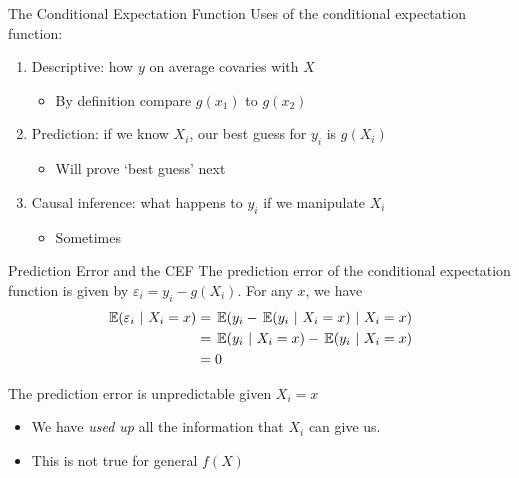 \documentclass[aspectratio=169,t,11pt,table]{beamer}
\begin{document}
\begin{frame}{The Conditional Expectation Function}
  Uses of the conditional expectation function:
  \begin{enumerate}
    \item \alert{Descriptive}: how $y$ on average covaries with $X$ 
    \begin{itemize}
      \item By definition compare $g(x_1)$ to $g(x_2)$
    \end{itemize} 

    \item \alert{Prediction}: if we know $X_i$, our best guess for $y_i$ is $g(X_i)$ 
    \begin{itemize}
      \item Will prove `best guess' next
    \end{itemize} 
    
    \item \alert{Causal inference}: what happens to $y_i$ if we manipulate $X_i$ 
    \begin{itemize}
      \item Sometimes
    \end{itemize}
  \end{enumerate}

\end{frame}


\begin{frame}{Prediction Error and the CEF}
  The prediction error of the conditional expectation function is given by $\varepsilon_i = y_i - g(X_i)$. For any $x$, we have 
  \begin{align*}
    \expec{\varepsilon_i}{X_i = x} 
    &= \expec{y_i - \expec{y_i}{X_i = x}}{X_i = x} \\
    &= \expec{y_i}{X_i = x} - \expec{y_i}{X_i = x} \\
    &= 0
  \end{align*}
  
  \pause
  The prediction error is unpredictable given $X_i = x$
  \begin{itemize}
    \item We have \emph{used up} all the information that $X_i$ can give us. 
    \item This is not true for general $f(X)$
  \end{itemize}
\end{frame}
\end{document}
